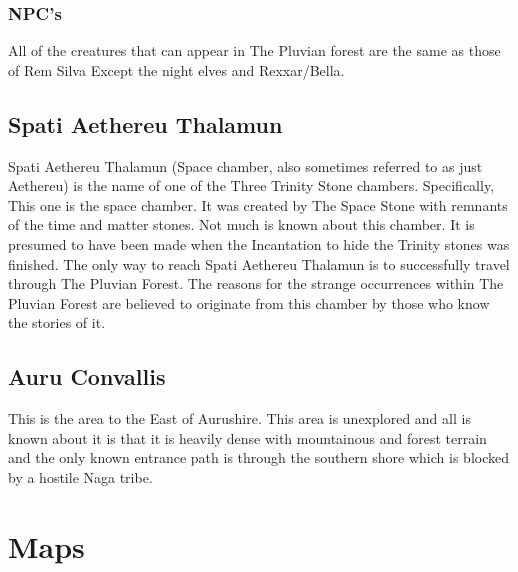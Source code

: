 \documentclass[letterpaper,10pt,twoside,twocolumn,openany]{book}
\begin{document}
\subsection{NPC's}
All of the creatures that can appear in The Pluvian forest are the same as those of Rem Silva Except the night elves and Rexxar/Bella.

\section{Spati Aethereu Thalamun}

Spati Aethereu Thalamun (Space chamber, also sometimes referred to as just Aethereu) is the name of one of the Three Trinity Stone chambers. Specifically, This one is the space chamber. It was created by The Space Stone with remnants of the time and matter stones. Not much is known about this chamber. It is presumed to have been made when the Incantation to hide the Trinity stones was finished. The only way to reach Spati Aethereu Thalamun is to successfully travel through The Pluvian Forest. The reasons for the strange occurrences within The Pluvian Forest are believed to originate from this chamber by those who know the stories of it.





\section{Auru Convallis}

This is the area to the East of Aurushire. This area is unexplored and all is known about it is that it is heavily dense with mountainous and forest terrain and the only known entrance path is through the southern shore which is blocked by a hostile Naga tribe.





\onecolumn
\chapter{Maps}
\end{document}
